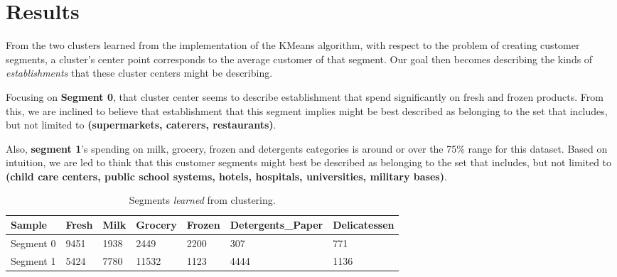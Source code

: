 \documentclass[twoside,openright,titlepage,numbers=noenddot,headinclude,%
               footinclude=true,cleardoublepage=empty,abstractoff,BCOR=5mm,%
               paper=a4,fontsize=11pt,ngerman,american]{scrreprt}
\numberwithin{theorem}{chapter}
\numberwithin{definition}{chapter}
\numberwithin{algorithm}{chapter}
\numberwithin{figure}{chapter}
\numberwithin{table}{chapter}
\numberwithin{equation}{chapter}
\begin{document}
\chapter*{Results}

From the two clusters learned from the implementation of the KMeans algorithm, with respect to the problem of creating customer segments, a cluster's center point corresponds to the average customer of that segment. Our goal then becomes describing the kinds of \emph{establishments} that these cluster centers might be describing.

Focusing on \textbf{Segment 0}, that cluster center seems to describe establishment that spend significantly on fresh and frozen products. From this, we are inclined to believe that establishment that this segment implies might be best described as belonging to the set that includes, but not limited to \textbf{(supermarkets, caterers, restaurants)}.


Also, \textbf{segment 1}'s spending on milk, grocery, frozen and detergents categories is around or over the 75\% range for this dataset. Based on intuition, we are led to think that this customer segments might best be described as belonging to the set that includes, but not limited to  \textbf{(child care centers, public school systems, hotels, hospitals, universities, military bases)}. 


\begin{table}[!htbp]
  \begin{center}
  \caption{Segments \emph{learned} from clustering.}
    \begin{tabular}{ |l|l|l|l|l|l|l| } 
    \hline
    Sample & Fresh & Milk & Grocery & Frozen & Detergents\_Paper & Delicatessen\\[1ex]

    \hline
    
      Segment 0 &9451  &1938  &2449  &2200  &307 &771 \\
      Segment 1 &5424  &7780  &11532 &1123  &4444  &1136  \\
      
    \hline
    \end{tabular}
    \label{tableSegments}
  \end{center}
\end{table}
\end{document}
